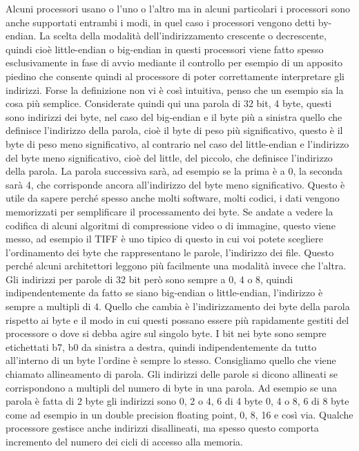 Alcuni processori usano o l'uno o l'altro ma in alcuni particolari i processori sono anche supportati entrambi i modi, in quel caso i processori vengono detti by-endian.
La scelta della modalità dell'indirizzamento crescente o decrescente, quindi cioè little-endian o big-endian in questi processori viene fatto spesso esclusivamente in fase di avvio mediante il controllo per esempio di un apposito piedino che consente quindi al processore di poter correttamente interpretare gli indirizzi.
Forse la definizione non vi è così intuitiva, penso che un esempio sia la cosa più semplice.
Considerate quindi qui una parola di 32 bit, 4 byte, questi sono indirizzi dei byte, nel caso del big-endian e il byte più a sinistra quello che definisce l'indirizzo della parola, cioè il byte di peso più significativo, questo è il byte di peso meno significativo, al contrario nel caso del little-endian e l'indirizzo del byte meno significativo, cioè del little, del piccolo, che definisce l'indirizzo della parola.
La parola successiva sarà, ad esempio se la prima è a 0, la seconda sarà 4, che corrisponde ancora all'indirizzo del byte meno significativo.
Questo è utile da sapere perché spesso anche molti software, molti codici, i dati vengono memorizzati per semplificare il processamento dei byte.
Se andate a vedere la codifica di alcuni algoritmi di compressione video o di immagine, questo viene messo, ad esempio il TIFF è uno tipico di questo in cui voi potete scegliere l'ordinamento dei byte che rappresentano le parole, l'indirizzo dei file.
Questo perché alcuni architettori leggono più facilmente una modalità invece che l'altra.
Gli indirizzi per parole di 32 bit però sono sempre a 0, 4 o 8, quindi indipendentemente da fatto se siano big-endian o little-endian, l'indirizzo è sempre a multipli di 4.
Quello che cambia è l'indirizzamento dei byte della parola rispetto ai byte e il modo in cui questi possano essere più rapidamente gestiti del processore o dove si debba agire sul singolo byte.
I bit nei byte sono sempre etichettati b7, b0 da sinistra a destra, quindi indipendentemente da tutto all'interno di un byte l'ordine è sempre lo stesso.
Consigliamo quello che viene chiamato allineamento di parola.
Gli indirizzi delle parole si dicono allineati se corrispondono a multipli del numero di byte in una parola.
Ad esempio se una parola è fatta di 2 byte gli indirizzi sono 0, 2 o 4, 6 di 4 byte 0, 4 o 8, 6 di 8 byte come ad esempio in un double precision floating point, 0, 8, 16 e così via.
Qualche processore gestisce anche indirizzi disallineati, ma spesso questo comporta incremento del numero dei cicli di accesso alla memoria.

